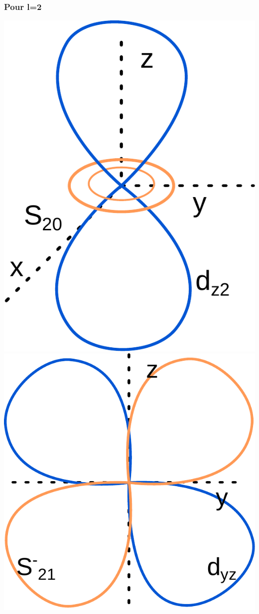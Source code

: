 \documentclass[french]{yLectureNote}
\begin{document}
\subsubsection{Pour l=2}
\includegraphics[scale=0.3]{s20}
\includegraphics[scale=0.3]{s-21}
\end{document}

